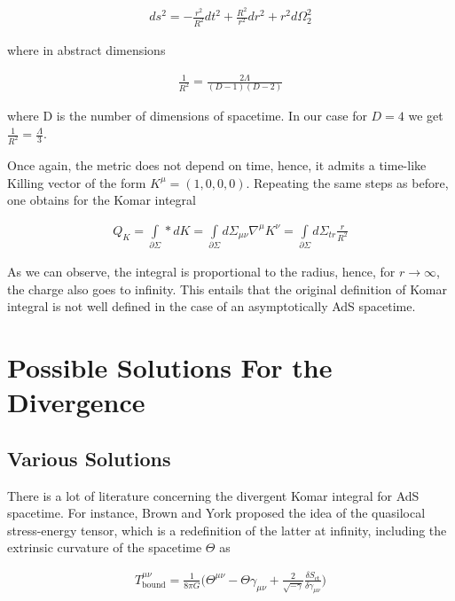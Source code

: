 \documentclass[a4paper,notitlepage]{report}
\begin{document}
\begin{align} \label{Z}
ds^2 = - \frac{r^2}{R^2} dt^2 + \frac{R^2}{r^2} dr^2 + r^2 d\Omega^2_2
\end{align}

\vspace{0.5 em}
where in abstract dimensions

\begin{align} \label{Z}
\frac{1}{R^2} = \frac{2\Lambda}{(D-1)(D-2)}
\end{align}

\vspace{0.5 em}
where D is the number of dimensions of spacetime. In our case for $D=4$ we get $\frac{1}{R^2} = \frac{\Lambda}{3}$.

Once again, the metric does not depend on time, hence, it admits a time-like Killing vector of the form $K^\mu = (1,0,0,0)$. Repeating the same steps as before, one obtains for the Komar integral

\begin{align} \label{Y}
Q_{K} = \int\limits_{\partial\Sigma}*dK = \int\limits_{\partial\Sigma} d\Sigma_{\mu\nu} \nabla^\mu K^\nu = \int\limits_{\partial\Sigma} d\Sigma_{tr} \frac{r}{R^2}
\end{align}

\vspace{0.5 em}
As we can observe, the integral is proportional to the radius, hence, for $r \rightarrow \infty$, the charge also goes to infinity. This entails that the original definition of Komar integral is not well defined in the case of an asymptotically AdS spacetime. 

\section{Possible Solutions For the Divergence}

\subsection{Various Solutions}

There is a lot of literature concerning the divergent Komar integral for AdS spacetime. For instance, Brown and York proposed the idea of the quasilocal stress-energy tensor, which is a redefinition of the latter at infinity, including the extrinsic curvature of the spacetime $\Theta$ as

\begin{align}
T^{\mu\nu}_{\text{bound}} = \frac{1}{8\pi G} \Big( \Theta^{\mu\nu} - \Theta \gamma_{\mu\nu} + \frac{2}{\sqrt{-\gamma}} \frac{\delta S_{\text{ct}}}{\delta \gamma_{\mu\nu}} \Big)
\end{align}
\end{document}
